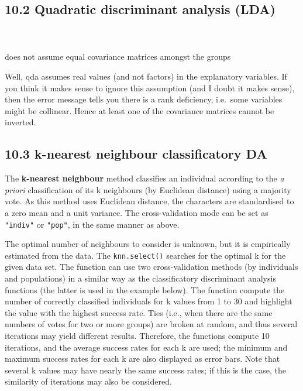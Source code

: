 \documentclass[
]{article}
\begin{document}
\hypertarget{quadratic-discriminant-analysis-lda}{%
\subsection{10.2 Quadratic discriminant analysis
(LDA)}\label{quadratic-discriminant-analysis-lda}}

~\\
\hspace*{0.333em}\\
does not assume equal covariance matrices amongst the groups

Well, qda assumes real values (and not factors) in the explanatory
variables. If you think it makes sense to ignore this assumption (and I
doubt it makes sense), then the error message tells you there is a rank
deficiency, i.e.~some variables might be collinear. Hence at least one
of the covariance matrices cannot be inverted.

\hypertarget{k-nearest-neighbour-classificatory-da}{%
\subsection{10.3 k-nearest neighbour classificatory
DA}\label{k-nearest-neighbour-classificatory-da}}

The \textbf{k-nearest neighbour} method classifies an individual
according to the \emph{a priori} classification of its k neighbours (by
Euclidean distance) using a majority vote. As this method uses Euclidean
distance, the characters are standardised to a zero mean and a unit
variance. The cross-validation mode can be set as \texttt{"indiv"} or
\texttt{"pop"}, in the same manner as above.

The optimal number of neighbours to consider is unknown, but it is
empirically estimated from the data. The \texttt{knn.select()} searches
for the optimal k for the given data set. The function can use two
cross-validation methods (by individuals and populations) in a similar
way as the classificatory discriminant analysis functions (the latter is
used in the example below). The function compute the number of correctly
classified individuals for k values from 1 to 30 and highlight the value
with the highest success rate. Ties (i.e., when there are the same
numbers of votes for two or more groups) are broken at random, and thus
several iterations may yield different results. Therefore, the functions
compute 10 iterations, and the average success rates for each k are
used; the minimum and maximum success rates for each k are also
displayed as error bars. Note that several k values may have nearly the
same success rates; if this is the case, the similarity of iterations
may also be considered.
\end{document}
